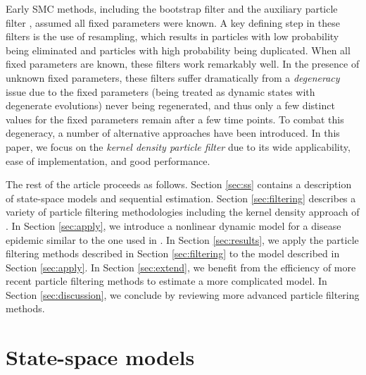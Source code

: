 \documentclass{elsarticle}
\begin{document}
Early SMC methods, including the bootstrap filter \citep{Gord:Salm:Smit:nove:1993,Kita:mont:1996} and the auxiliary particle filter \citep{Pitt:Shep:filt:1999}, assumed all fixed parameters were known. A key defining step in these filters is the use of resampling, which results in particles with low probability being eliminated and particles with high probability being duplicated. When all fixed parameters are known, these filters work remarkably well. In the presence of unknown fixed parameters, these filters suffer dramatically from a \emph{degeneracy} issue due to the fixed parameters (being treated as dynamic states with degenerate evolutions) never being regenerated, and thus only a few distinct values for the fixed parameters remain after a few time points. To combat this degeneracy, a number of alternative approaches have been introduced. In this paper, we focus on the \emph{kernel density particle filter} \citep{Liu:West:comb:2001} due to its wide applicability, ease of implementation, and good performance.

The rest of the article proceeds as follows. Section \ref{sec:ss} contains a description of state-space models and sequential estimation. Section \ref{sec:filtering} describes a variety of particle filtering methodologies including the kernel density approach of \cite{Liu:West:comb:2001}. In Section \ref{sec:apply}, we introduce a nonlinear dynamic model for a disease epidemic similar to the one used in \citet{skvortsov2012monitoring}. In Section \ref{sec:results}, we apply the particle filtering methods described in Section \ref{sec:filtering} to the model described in Section \ref{sec:apply}. In Section \ref{sec:extend}, we benefit from the efficiency of more recent particle filtering methods to estimate a more complicated model. In Section \ref{sec:discussion}, we conclude by reviewing more advanced particle filtering methods.

\section{State-space models \label{sec:ss}}
\end{document}
